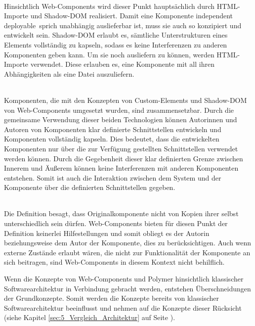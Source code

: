 \begin{enumerate}

\hfill \\
Hinsichtlich Web-Components wird dieser Punkt hauptsächlich durch HTML-Importe und Shadow-DOM  realisiert. Damit eine Komponente \glqq independent deployable\grqq\ sprich unabhängig auslieferbar ist, muss sie auch so konzipiert und entwickelt sein. Shadow-DOM erlaubt es, sämtliche Unterstrukturen eines Elements vollständig zu kapseln, sodass es keine Interferenzen zu anderen Komponenten geben kann. Um sie noch ausliefern zu können, werden HTML-Importe verwendet. Diese erlauben es, eine Komponente mit all ihren Abhängigkeiten als eine Datei auszuliefern.

 \hfill \\
Komponenten, die mit den Konzepten von Custom-Elements und Shadow-DOM von Web-Components umgesetzt wurden, sind zusammensetzbar. Durch die gemeinsame Verwendung dieser beiden Technologien können Autorinnen und Autoren von Komponenten klar definierte Schnittstellen entwickeln und Komponenten vollständig kapseln. Dies bedeutet, dass die entwickelten Komponenten nur über die zur Verfügung gestellten Schnittstellen verwendet werden können. Durch die Gegebenheit dieser klar definierten Grenze zwischen Innerem und Äußerem können keine Interferenzen mit anderen Komponenten entstehen. Somit ist auch die Interaktion zwischen dem System und der Komponente über die definierten Schnittstellen gegeben.

\hfill \\
Die Definition besagt, dass Originalkomponente nicht von Kopien ihrer selbst unterschiedlich sein dürfen. Web-Components bieten für diesen Punkt der Definition keinerlei Hilfestellungen und somit obliegt es der Autorin beziehungsweise dem Autor der Komponente, dies zu berücksichtigen.
Auch wenn externe Zustände erlaubt wären, die nicht zur Funktionalität der Komponente an sich beitragen, sind Web-Components in diesem Kontext nicht behilflich.

\end{enumerate}

Wenn die Konzepte von Web-Components und Polymer hinsichtlich klassischer Softwarearchitektur in Verbindung gebracht werden, entstehen Überschneidungen der Grundkonzepte. Somit werden die Konzepte bereits von klassischer Softwarearchitektur beeinflusst und nehmen auf die Konzepte dieser Rücksicht (siehe Kapitel \ref{sec:5_Vergleich_Architektur} auf Seite \pageref{sec:5_Vergleich_Architektur}).

